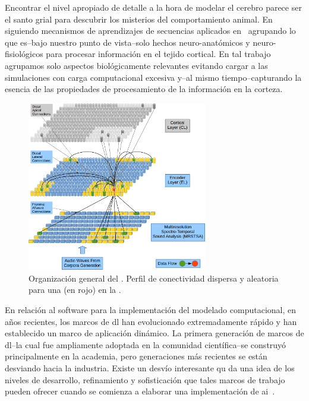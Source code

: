 {Encontrar el nivel apropiado de detalle a la hora de modelar el cerebro parece ser el santo grial para descubrir los misterios del comportamiento animal.
En~\cite{10.1371/journal.pone.0217966} siguiendo mecanismos de aprendizajes de secuencias aplicados en~\cite{10.3389/fncir.2016.00023} agrupando lo que es--bajo nuestro punto de vista--solo hechos neuro-anatómicos y neuro-fisiológicos para procesar información en el tejido cortical.
En tal trabajo agrupamos solo aspectos biológicamente relevantes evitando cargar a las simulaciones con carga computacional excesiva y--al mismo tiempo--capturando la esencia de las propiedades de procesamiento de la información en la corteza.

\begin{figure}[ht]
    \centering
    \includegraphics[width=0.7\textwidth]{EncoderColumnConnections1.png}
    \caption{Organización general del . Perfil de conectividad dispersa y aleatoria para una  (en rojo) en la .}
    \label{fig:EncoderColumnConnections1}
\end{figure}

En relación al software para la implementación del modelado computacional, en años recientes, los marcos de \gls{dl} han evolucionado extremadamente rápido y han establecido un marco de aplicación dinámico.
La primera generación de marcos de \gls{dl}--la cual fue ampliamente adoptada en la comunidad científica--se construyó principalmente en la academia, pero generaciones más recientes se están desviando hacia la industria.
Existe un desvío interesante qu da una idea de los niveles de desarrollo, refinamiento y sofisticación que tales marcos de trabajo pueden ofrecer cuando se comienza a elaborar una implementación de \gls{ai}~\cite{Bahrampour2015ComparativeSO,7979887}.

}
